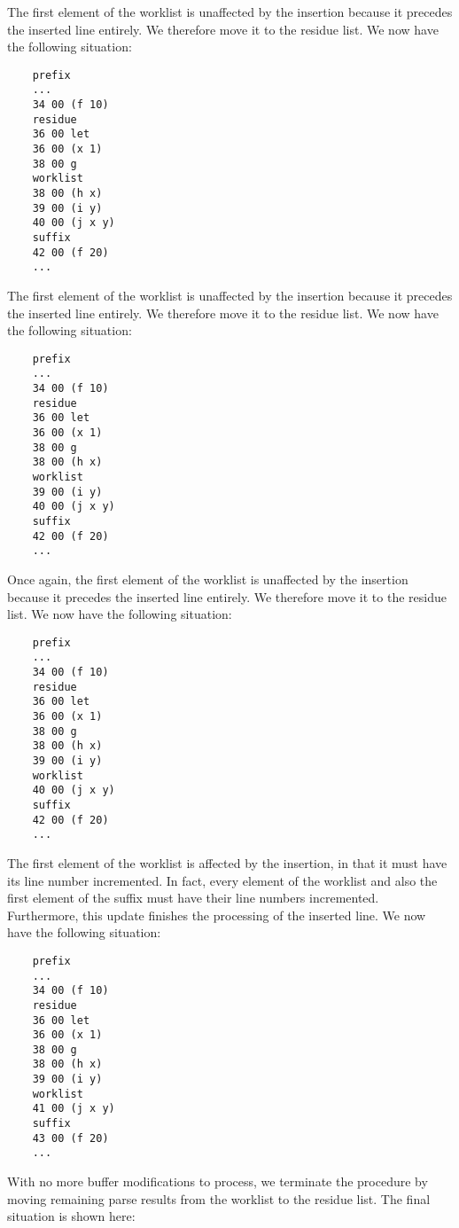 The first element of the worklist is unaffected by the insertion
because it precedes the inserted line entirely.  We therefore move it
to the residue list.  We now have the following situation:

{\small\begin{verbatim}
    prefix
    ...
    34 00 (f 10)
    residue
    36 00 let
    36 00 (x 1)
    38 00 g
    worklist
    38 00 (h x)
    39 00 (i y)
    40 00 (j x y)
    suffix
    42 00 (f 20)
    ...
\end{verbatim}}

The first element of the worklist is unaffected by the insertion
because it precedes the inserted line entirely.  We therefore move it
to the residue list.  We now have the following situation:

{\small\begin{verbatim}
    prefix
    ...
    34 00 (f 10)
    residue
    36 00 let
    36 00 (x 1)
    38 00 g
    38 00 (h x)
    worklist
    39 00 (i y)
    40 00 (j x y)
    suffix
    42 00 (f 20)
    ...
\end{verbatim}}

Once again, the first element of the worklist is unaffected by the
insertion because it precedes the inserted line entirely.  We
therefore move it to the residue list.  We now have the following
situation:

{\small\begin{verbatim}
    prefix
    ...
    34 00 (f 10)
    residue
    36 00 let
    36 00 (x 1)
    38 00 g
    38 00 (h x)
    39 00 (i y)
    worklist
    40 00 (j x y)
    suffix
    42 00 (f 20)
    ...
\end{verbatim}}

The first element of the worklist is affected by the insertion, in
that it must have its line number incremented.  In fact, every element
of the worklist and also the first element of the suffix must have
their line numbers incremented.  Furthermore, this update finishes the
processing of the inserted line.  We now have the following situation:

{\small\begin{verbatim}
    prefix
    ...
    34 00 (f 10)
    residue
    36 00 let
    36 00 (x 1)
    38 00 g
    38 00 (h x)
    39 00 (i y)
    worklist
    41 00 (j x y)
    suffix
    43 00 (f 20)
    ...
\end{verbatim}}

With no more buffer modifications to process, we terminate the
procedure by moving remaining parse results from the worklist to the
residue list.  The final situation is shown here:


